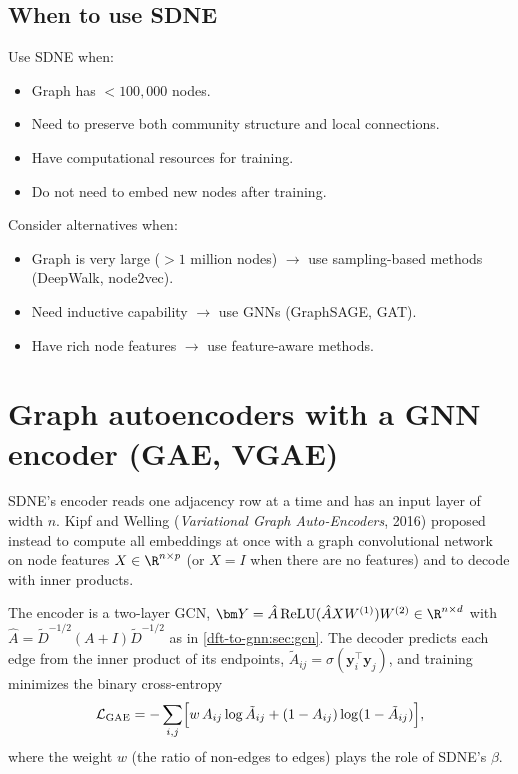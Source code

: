 \begin{notechapter}
\subsection{When to use SDNE}

Use SDNE when:
\begin{itemize}
    \item Graph has $<100{,}000$ nodes.
    \item Need to preserve both community structure and local connections.
    \item Have computational resources for training.
    \item Do not need to embed new nodes after training.
\end{itemize}

Consider alternatives when:
\begin{itemize}
    \item Graph is very large ($>1$ million nodes) $\rightarrow$ use sampling-based methods (DeepWalk, node2vec).
    \item Need inductive capability $\rightarrow$ use GNNs (GraphSAGE, GAT).
    \item Have rich node features $\rightarrow$ use feature-aware methods.
\end{itemize}

\section{Graph autoencoders with a GNN encoder (GAE, VGAE)}

SDNE's encoder reads one adjacency row at a time and has an input layer of width $n$. Kipf and Welling (\emph{Variational Graph Auto-Encoders}, 2016) proposed instead to compute all embeddings at once with a graph convolutional network on node features $X \in \R^{n\times p}$ (or $X = I$ when there are no features) and to decode with inner products.

\begin{definition}
The encoder is a two-layer GCN, $\bm Y = \hat A\,\mathrm{ReLU}(\hat AXW^{(1)})W^{(2)} \in \R^{n\times d}$ with $\hat A = \tilde D^{-1/2}(A + I)\tilde D^{-1/2}$ as in \cref{dft-to-gnn:sec:gcn}. The decoder predicts each edge from the inner product of its endpoints, $\tilde A_{ij} = \sigma(\bm y_i^\top\bm y_j)$, and training minimizes the binary cross-entropy
\[
\mathcal L_{\text{GAE}} = -\sum_{i,j}\Bigl[w\,A_{ij}\log\tilde A_{ij} + (1 - A_{ij})\log(1 - \tilde A_{ij})\Bigr],
\]
where the weight $w$ (the ratio of non-edges to edges) plays the role of SDNE's $\beta$.
\end{definition}


\end{notechapter}
